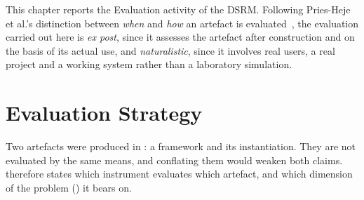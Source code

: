 \label{chap:evaluation}

This chapter reports the Evaluation activity of the \ac{DSRM}. Following Pries-Heje et al.'s distinction between \emph{when} and \emph{how} an artefact is evaluated~\cite{J.Pries-Heje:2008SD}, the evaluation carried out here is \emph{ex post}, since it assesses the artefact after construction and on the basis of its actual use, and \emph{naturalistic}, since it involves real users, a real project and a working system rather than a laboratory simulation.

\section{Evaluation Strategy}
\label{sec:eval_strategy}

Two artefacts were produced in : a framework and its instantiation. They are not evaluated by the same means, and conflating them would weaken both claims.  therefore states which instrument evaluates which artefact, and which dimension of the problem () it bears on.

